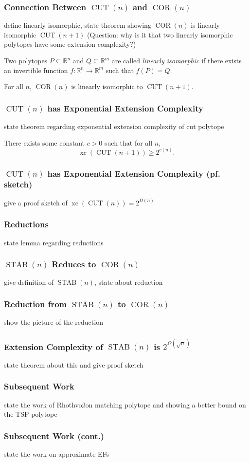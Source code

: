 \documentclass{beamer}
\newcommand{\xc}{\operatorname{xc}}
\newcommand{\STAB}{\operatorname{STAB}}
\newcommand{\CUT}{\operatorname{CUT}}
\newcommand{\COR}{\operatorname{COR}}
\renewcommand{\R}{\mathbb{R}}
\begin{document}
\begin{frame}
\frametitle{Connection Between $\CUT(n)$ and $\COR(n)$}
define linearly isomorphic, state theorem showing $\COR(n)$ is linearly isomorphic $\CUT(n+1)$ (Question: why is it that two linearly isomorphic polytopes have some extension complexity?)

\begin{definition}\label{def:lin-iso}
Two polytopes $P \subseteq \R^n$ and $Q \subseteq \R^m$ are called \textit{linearly isomorphic} if there exists an invertible function $f : \R^n \to \R^m$ such that $f(P) = Q$.
\end{definition}
\begin{lemma}
For all $n$, $\COR(n)$ is linearly isomorphic to $\CUT(n+1)$.
\end{lemma}
\end{frame}

\begin{frame}
\frametitle{$\CUT(n)$ has Exponential Extension Complexity}
state theorem regarding exponential extension complexity of cut polytope

\begin{theorem}
There exists some constant $c > 0$ such that for all $n$,
\[
\xc(\CUT(n+1)) \geq 2^{c(n)}.
\]
\end{theorem}
\end{frame}

\begin{frame}
\frametitle{$\CUT(n)$ has Exponential Extension Complexity (pf. sketch)}
give a proof sketch of $\xc(\CUT(n)) = 2^{\Omega(n)}$

\end{frame}

\begin{frame}
\frametitle{Reductions}
state lemma regarding reductions
\end{frame}

\begin{frame}
\frametitle{$\STAB(n)$ Reduces to $\COR(n)$}
give definition of $\STAB(n)$, state about reduction
\end{frame}

\begin{frame}
\frametitle{Reduction from $\STAB(n)$ to $\COR(n)$}
show the picture of the reduction
\end{frame}

\begin{frame}
\frametitle{Extension Complexity of $\STAB(n)$ is $2^{\Omega(\sqrt{n})}$}
state theorem about this and give proof sketch
\end{frame}

\begin{frame}
\frametitle{Subsequent Work}
state the work of Rhothvo\ss on matching polytope and showing a better bound on the TSP polytope
\end{frame}

\begin{frame}
\frametitle{Subsequent Work (cont.)}
state the work on approximate EFs
\end{frame}
\end{document}

